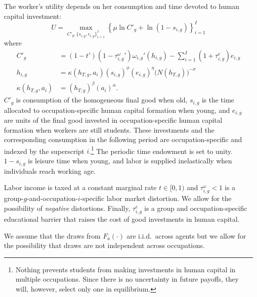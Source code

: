 \documentclass[onehalfspacing,11pt]{article}
\begin{document}
The worker's utility depends on her consumption and time devoted to human capital investment:
\begin{equation}
U = \max_{C'_{g},\{s_{i,g},e_{i,g}\}_{i=1}^I} \left\{\mu \ln C'_{g} + \ln\left(1-s_{i,g} \right) \label{eq:util} \right\}_{i=1}^I
\end{equation}
where
\begin{align}
\label{}
C'_{g} & =(1-t')(1-\tau^\omega_{i,g}')\omega_{i,g}'(h_{i,g})- \sum_{i=1}^I(1+\tau^e_{i,g})e_{i,g} \label{eq:bc}\\ %
h_{i,g} & =\kappa(h_{T,g},a_i)(s_{i,g})^{\phi} (e_{i,g})^{\eta}\big(N(h_{T,g})\big)^{-\sigma} \label{eq:h}\\
\kappa(h_{T,g},a_i) & =(h_{T,g})^\beta \left(a_i \right)^\alpha. \label{eq:g(h,a)}
\end{align}
$C'_{g}$ is consumption of the homogeneous final good when old, $s_{i,g}$ is the time allocated to occupation-specific human capital formation when young, and $e_{i,g}$ are units of the final good invested in occupation-specific human capital formation when workers are still students. These investments and the corresponding consumption in the following period are occupation-specific and indexed by the superscript $i$.\footnote{Nothing prevents students from making investments in human capital in multiple occupations. Since there is no uncertainty in future payoffs, they will, however, select only one in equilibrium.} The periodic time endowment is set to unity. $1-s_{i,g}$ is leisure time when young, and labor is supplied inelastically when individuals reach working age.

Labor income is taxed at a constant marginal rate $t \in [0,1)$ and $\tau^\omega_{i,g} < 1$ is a group-$g$-and-occupation-$i$-specific labor market distortion. We allow for the possibility of {\it negative} distortions. Finally, $\tau^e_{i,g}$ is a group and occupation-specific educational barrier that raises the cost of good investments in human capital.


We assume that the draws from $F_a \left( \cdot \right)$ are i.i.d.~across agents but we allow for the possibility that draws are not independent across occupations.
\end{document}
